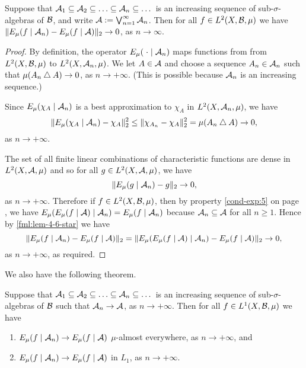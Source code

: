 \begin{lemma} \label{lem:walters-4-6}
	Suppose that $\A_1 \subset \A_2 \subset \dots \subset \A_n \subset \dots$ is an increasing sequence of sub-$\sigma$-algebras of $\mathcal{B}$, and write $\mathcal{A} := \bigvee_{n = 1}^\infty{\mathcal{A}_n}$. Then for all $f \in L^2(X, \mathcal{B}, \mu)$ we have $\|E_\mu(f \mid \mathcal{A}_n) - E_\mu(f \mid \mathcal{A})\|_2 \to 0$, as $n \to \infty$.
	\begin{proof}
		By definition, the operator $E_\mu(\mathrel{}\cdot\mathrel{} \mid \mathcal{A}_n)$ maps functions from from $L^2(X, \mathcal{B}, \mu)$ to $L^2(X, \mathcal{A}_n, \mu)$. We let $A \in \mathcal{A}$ and choose a sequence $A_n \in \mathcal{A}_n$ such that $\mu(A_n \bigtriangleup A) \to 0$, as $n \to +\infty$. (This is possible because $\mathcal{A}_n$ is an increasing sequence.)
		
		Since $E_\mu(\chi_A \mid \mathcal{A}_n)$ is a best approximation to $\chi_A$ in $L^2(X, \mathcal{A}_n, \mu)$, we have
		\[
			\|E_\mu(\chi_A \mid \mathcal{A}_n) - \chi_A\|_2^2 \leq \|\chi_{A_n} - \chi_A\|_2^2 = \mu(A_n \bigtriangleup A) \to 0,
		\]
		as $n \to +\infty$.
		
		The set of all finite linear combinations of characteristic functions are dense in $L^2(X, \mathcal{A}, \mu)$ and so for all $g \in L^2(X, \mathcal{A}, \mu)$, we have
		\begin{equation} \label{fml:lem-4-6-star}
			\|E_\mu(g \mid \mathcal{A}_n) - g\|_2 \to 0,
		\end{equation}
		as $n \to +\infty$. Therefore if $f \in L^2(X, \mathcal{B}, \mu)$, then by property \ref{cond-exp:5} on page \pageref{cond-exp:5}, we have $E_\mu(E_\mu(f \mid \mathcal{A}) \mid \mathcal{A}_n) = E_\mu(f \mid \mathcal{A}_n)$ because $\mathcal{A}_n \subseteq \mathcal{A}$ for all $n \geq 1$. Hence by \eqref{fml:lem-4-6-star} we have
		\[
			\|E_\mu(f \mid \mathcal{A}_n) - E_\mu(f \mid \mathcal{A})\|_2 = \|E_\mu(E_\mu(f \mid \mathcal{A}) \mid \mathcal{A}_n) - E_\mu(f \mid \mathcal{A})\|_2 \to 0,
		\]
		as $n \to +\infty$, as required.
	\end{proof}
\end{lemma}

We also have the following theorem.

\begin{theorem} \label{thm:increasing-martingale}
	Suppose that $\A_1 \subset \A_2 \subset \dots \subset \A_n \subset \dots$ is an increasing sequence of sub-$\sigma$-algebras of $\mathcal{B}$ such that $\mathcal{A}_n \to \mathcal{A}$, as $n \to +\infty$. Then for all $f \in L^1(X, \mathcal{B}, \mu)$ we have
	\begin{enumerate}
		\item $E_\mu(f \mid \mathcal{A}_n) \to E_\mu(f \mid \mathcal{A})$ $\mu$-almost everywhere, as $n \to +\infty$, and
		\item $E_\mu(f \mid \mathcal{A}_n) \to E_\mu(f \mid \mathcal{A})$ in $L_1$, as $n \to +\infty$.
	\end{enumerate}
\end{theorem}

